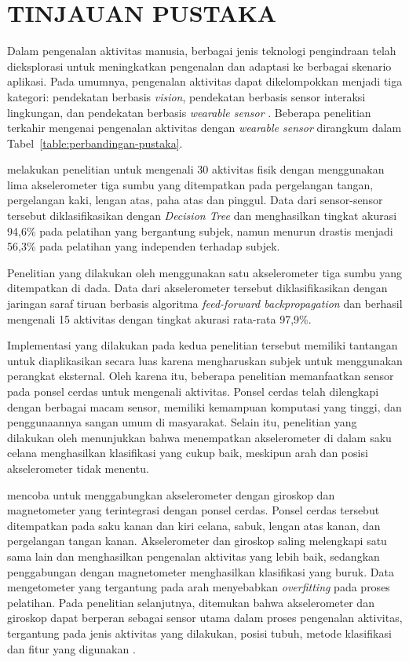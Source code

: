 \chapter{TINJAUAN PUSTAKA}

Dalam pengenalan aktivitas manusia, berbagai jenis teknologi pengindraan telah dieksplorasi untuk meningkatkan pengenalan dan adaptasi ke berbagai skenario aplikasi. Pada umumnya, pengenalan aktivitas dapat dikelompokkan menjadi tiga kategori: pendekatan berbasis \textit{vision}, pendekatan berbasis sensor interaksi lingkungan, dan pendekatan berbasis \textit{wearable sensor} \Parencite{wang-2016}. Beberapa penelitian terkahir mengenai pengenalan aktivitas dengan \textit{wearable sensor} dirangkum dalam Tabel~\ref{table:perbandingan-pustaka}.

\Textcite{tapia-2007} melakukan penelitian untuk mengenali 30 aktivitas fisik dengan menggunakan lima akselerometer tiga sumbu yang ditempatkan pada pergelangan tangan, pergelangan kaki, lengan atas, paha atas dan pinggul. Data dari sensor-sensor tersebut diklasifikasikan dengan \textit{Decision Tree} dan menghasilkan tingkat akurasi 94,6\% pada pelatihan yang bergantung subjek, namun menurun drastis menjadi 56,3\% pada pelatihan yang independen terhadap subjek.

Penelitian yang dilakukan oleh \Textcite{khan-2010} menggunakan satu akselerometer tiga sumbu yang ditempatkan di dada. Data dari akselerometer tersebut diklasifikasikan dengan jaringan saraf tiruan berbasis algoritma \textit{feed-forward backpropagation} dan berhasil mengenali 15 aktivitas dengan tingkat akurasi rata-rata 97,9\%.

Implementasi yang dilakukan pada kedua penelitian tersebut memiliki tantangan untuk diaplikasikan secara luas karena mengharuskan subjek untuk menggunakan perangkat eksternal. Oleh karena itu, beberapa penelitian memanfaatkan sensor pada ponsel cerdas untuk mengenali aktivitas. Ponsel cerdas telah dilengkapi dengan berbagai macam sensor, memiliki kemampuan komputasi yang tinggi, dan penggunaannya sangan umum di masyarakat. Selain itu, penelitian yang dilakukan oleh \Textcite{he-2008} menunjukkan bahwa menempatkan akselerometer di dalam saku celana menghasilkan klasifikasi yang cukup baik, meskipun arah dan posisi akselerometer tidak menentu.

\Textcite{shoaib-2013} mencoba untuk menggabungkan akselerometer dengan giroskop dan magnetometer yang terintegrasi dengan ponsel cerdas. Ponsel cerdas tersebut ditempatkan pada saku kanan dan kiri celana, sabuk, lengan atas kanan, dan pergelangan tangan kanan. Akselerometer dan giroskop saling melengkapi satu sama lain dan menghasilkan pengenalan aktivitas yang lebih baik, sedangkan penggabungan dengan magnetometer menghasilkan klasifikasi yang buruk. Data mengetometer yang tergantung pada arah menyebabkan \textit{overfitting} pada proses pelatihan. Pada penelitian selanjutnya, ditemukan bahwa akselerometer dan giroskop dapat berperan sebagai sensor utama dalam proses pengenalan aktivitas, tergantung pada jenis aktivitas yang dilakukan, posisi tubuh, metode klasifikasi dan fitur yang digunakan \Parencite{shoaib-2014}.

